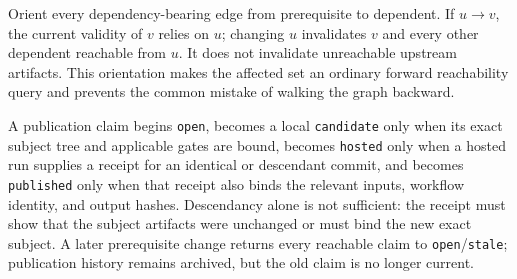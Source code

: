 \documentclass[11pt]{article}
\begin{document}

Orient every dependency-bearing edge from prerequisite to dependent.  If \(u\to v\), the current
validity of \(v\) relies on \(u\); changing \(u\) invalidates \(v\) and every other dependent
reachable from \(u\).  It does not invalidate unreachable upstream artifacts.  This orientation
makes the affected set an ordinary forward reachability query and prevents the common mistake of
walking the graph backward.

A publication claim begins \texttt{open}, becomes a local \texttt{candidate} only when its exact
subject tree and applicable gates are bound, becomes \texttt{hosted} only when a hosted run supplies
a receipt for an identical or descendant commit, and becomes \texttt{published} only when that
receipt also binds the relevant inputs, workflow identity, and output hashes.  Descendancy alone is
not sufficient: the receipt must show that the subject artifacts were unchanged or must bind the
new exact subject.  A later prerequisite change returns every reachable claim to
\texttt{open}/\texttt{stale}; publication history remains archived, but the old claim is no longer
current.
\end{document}
